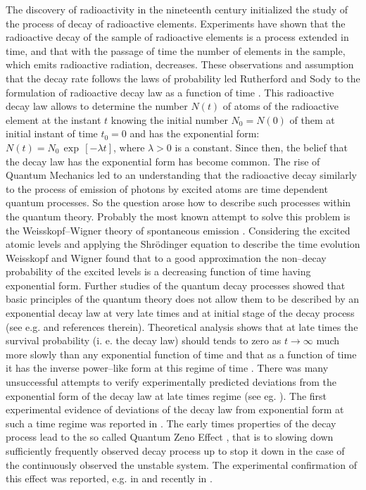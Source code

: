 \documentclass[12pt]{article}
\begin{document}
The discovery of radioactivity in the nineteenth century initialized  the study of the process of decay of radioactive elements. Experiments have shown that the radioactive decay of the sample of radioactive elements is a process extended in time, and that with the passage of time  the number of elements in the sample, which emits radioactive radiation,
decreases. These observations and assumption that the decay rate follows the laws of probability led Rutherford and Sody to the formulation of radioactive decay law as a function of time \cite{rutheford,rutheford1}. This radioactive decay law allows to determine the number  $N (t)$ of atoms of the radioactive element at the instant $t$  knowing the initial number  $N_{0} = N(0)$ of them  at  initial instant of time $t_{0} =0$ and has the exponential form:  $N(t) =N_{0}\,\exp\,[-\lambda t]$, where $\lambda > 0$ is a constant.
Since then, the belief that the  decay law has the exponential form has become common.
The rise of Quantum Mechanics    led to an understanding that the radioactive decay similarly to the process of  emission of photons  by excited atoms are  time dependent quantum processes. So the question arose how to describe such  processes within the quantum theory. Probably the most known attempt to solve this problem is the Weisskopf--Wigner
theory of spontaneous emission \cite{WW}. Considering the excited atomic levels and applying the Shr\"{o}dinger equation to describe the time evolution Weisskopf and Wigner
found that to a good approximation the non--decay probability of the excited levels is a decreasing function of time having exponential form.
Further studies of the quantum decay processes showed that basic principles of the quantum theory  does not allow them to be described by an exponential decay law at very late times
\cite{khalfin,fonda} and at initial stage of the decay process (see e.g. \cite{fonda} and references therein). Theoretical analysis shows that at late times the survival probability (i. e. the decay law) should tends to zero as
$t \to \infty$ much more slowly than any exponential function of time and that
as a function of time
it has the inverse power--like form
at this  regime of time \cite{khalfin,fonda}.
There was many unsuccessful attempts to verify experimentally predicted deviations from the exponential form of the decay law at late times regime (see eg. \cite{norman}). The first experimental evidence of deviations of the decay law from exponential form at such a time regime was reported in \cite{rothe}. The early times properties of the decay process lead to the so called Quantum Zeno Effect \cite{misra,fischer}, that is to slowing down sufficiently frequently observed decay process up to stop it down in the case of the continuously observed the unstable system. The experimental confirmation of this effect was reported, e.g.  in \cite{itano} and recently in \cite{patil}.
\end{document}
